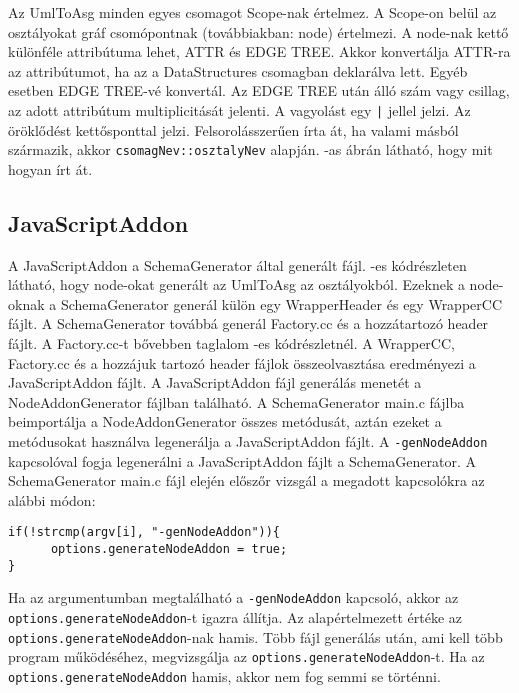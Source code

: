 Az UmlToAsg minden egyes csomagot Scope-nak értelmez.
A Scope-on belül az osztályokat gráf csomópontnak (továbbiakban: node) értelmezi.
A node-nak kettő különféle attribútuma lehet, ATTR és EDGE TREE.
Akkor konvertálja ATTR-ra az attribútumot, ha az a DataStructures csomagban deklarálva lett. Egyéb esetben EDGE TREE-vé konvertál.
Az EDGE TREE után álló szám vagy csillag, az adott attribútum multiplicitását jelenti.
A vagyolást egy \texttt{|} jellel jelzi.
Az öröklődést kettősponttal jelzi.
Felsorolásszerűen írta át, ha valami másból származik, akkor \texttt{csomagNev::osztalyNev} alapján.
-as ábrán látható, hogy mit hogyan írt át.

\subsection{JavaScriptAddon}\label{chap:javaScriptAddon_bevezetes}
A JavaScriptAddon a SchemaGenerator által generált fájl.
-es kódrészleten látható, hogy node-okat generált az UmlToAsg az osztályokból.
Ezeknek a node-oknak a SchemaGenerator generál külön egy WrapperHeader és egy WrapperCC fájlt.
A SchemaGenerator továbbá generál Factory.cc és a hozzátartozó header fájlt. A Factory.cc-t bővebben taglalom -es kódrészletnél.
A WrapperCC, Factory.cc és a hozzájuk tartozó header fájlok összeolvasztása eredményezi a JavaScriptAddon fájlt.
A JavaScriptAddon fájl generálás menetét a NodeAddonGenerator fájlban található.
A SchemaGenerator main.c fájlba beimportálja a NodeAddonGenerator összes metódusát, aztán ezeket a metódusokat használva legenerálja a JavaScriptAddon fájlt.
A \texttt{-genNodeAddon} kapcsolóval fogja legenerálni a JavaScriptAddon fájlt a SchemaGenerator.
A SchemaGenerator main.c fájl elején előszőr vizsgál a megadott kapcsolókra az alábbi módon:

\begin{lstlisting}[caption={SchemaGenerator kapcsoló vizsgálás},label={lst:schemagenerator_argv_genNodeAddon}, language={CStyle}]
if(!strcmp(argv[i], "-genNodeAddon")){
      options.generateNodeAddon = true;
}
\end{lstlisting}

Ha az argumentumban megtalálható a \texttt{-genNodeAddon} kapcsoló, akkor az \texttt{options.generateNodeAddon}-t igazra állítja.
Az alapértelmezett értéke az \texttt{options.generateNodeAddon}-nak hamis.
Több fájl generálás után, ami kell több program működéséhez, megvizsgálja az \texttt{options.generateNodeAddon}-t.
Ha az \texttt{options.generateNodeAddon} hamis, akkor nem fog semmi se történni.

